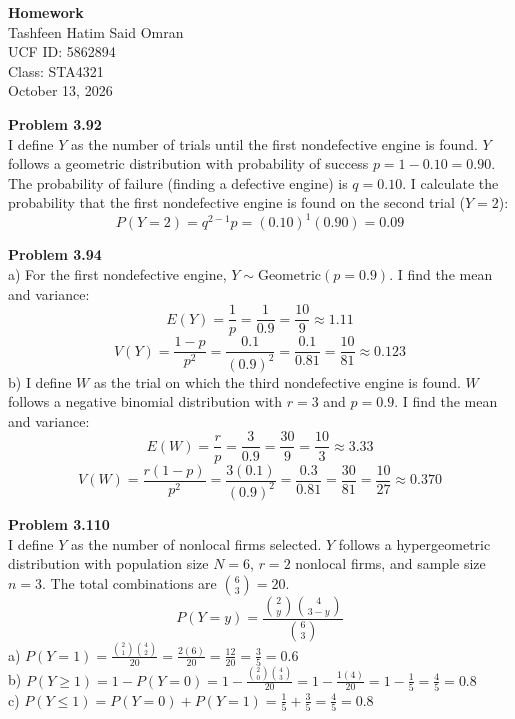 \documentclass[12pt]{article}
\begin{document}
\begin{center}
    \textbf{\Large Homework}\\
    Tashfeen Hatim Said Omran\\
    UCF ID: 5862894\\
    Class: STA4321\\
    October 13, 2026
\end{center}

\vspace{0.5cm}

\noindent \textbf{Problem 3.92} \\
I define $Y$ as the number of trials until the first nondefective engine is found. $Y$ follows a geometric distribution with probability of success $p = 1 - 0.10 = 0.90$. The probability of failure (finding a defective engine) is $q = 0.10$.
I calculate the probability that the first nondefective engine is found on the second trial ($Y = 2$):
\[ P(Y = 2) = q^{2-1} p = (0.10)^1(0.90) = 0.09 \]

\vspace{0.5cm}

\noindent \textbf{Problem 3.94} \\
a) For the first nondefective engine, $Y \sim \text{Geometric}(p = 0.9)$. I find the mean and variance:
\[ E(Y) = \frac{1}{p} = \frac{1}{0.9} = \frac{10}{9} \approx 1.11 \]
\[ V(Y) = \frac{1-p}{p^2} = \frac{0.1}{(0.9)^2} = \frac{0.1}{0.81} = \frac{10}{81} \approx 0.123 \]
b) I define $W$ as the trial on which the third nondefective engine is found. $W$ follows a negative binomial distribution with $r = 3$ and $p = 0.9$. I find the mean and variance:
\[ E(W) = \frac{r}{p} = \frac{3}{0.9} = \frac{30}{9} = \frac{10}{3} \approx 3.33 \]
\[ V(W) = \frac{r(1-p)}{p^2} = \frac{3(0.1)}{(0.9)^2} = \frac{0.3}{0.81} = \frac{30}{81} = \frac{10}{27} \approx 0.370 \]

\vspace{0.5cm}

\noindent \textbf{Problem 3.110} \\
I define $Y$ as the number of nonlocal firms selected. $Y$ follows a hypergeometric distribution with population size $N = 6$, $r = 2$ nonlocal firms, and sample size $n = 3$. The total combinations are $\binom{6}{3} = 20$.
\[ P(Y = y) = \frac{\binom{2}{y}\binom{4}{3-y}}{\binom{6}{3}} \]
a) $P(Y = 1) = \frac{\binom{2}{1}\binom{4}{2}}{20} = \frac{2(6)}{20} = \frac{12}{20} = \frac{3}{5} = 0.6$ \\
b) $P(Y \ge 1) = 1 - P(Y = 0) = 1 - \frac{\binom{2}{0}\binom{4}{3}}{20} = 1 - \frac{1(4)}{20} = 1 - \frac{1}{5} = \frac{4}{5} = 0.8$ \\
c) $P(Y \le 1) = P(Y = 0) + P(Y = 1) = \frac{1}{5} + \frac{3}{5} = \frac{4}{5} = 0.8$
\end{document}
